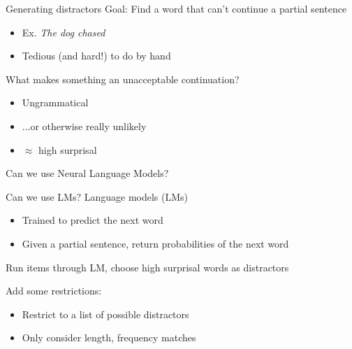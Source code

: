 \documentclass[12pt, xcolor=beamer,table,usenames,dvipsnames, ignorenonframetext, ngerman,t]{beamer}
\begin{document}
%
\begin{frame}{Generating distractors}
\pause
Goal: Find a word that can't continue a partial sentence
\begin{itemize}
	\item Ex.  \textit{The dog chased} \pause
	\item Tedious (and hard!) to do by hand
\end{itemize} \pause

What makes something an unacceptable continuation? \pause
\begin{itemize}
	\item Ungrammatical \pause
	\item ...or otherwise really unlikely \pause 
	\item $\approx$ high surprisal 
\end{itemize} \pause

Can we use Neural Language Models?
\end{frame}
%
\begin{frame}{Can we use LMs?}
	\pause
Language models (LMs)
\begin{itemize}
	\item Trained to predict the next word
	\item Given a partial sentence, return probabilities of the next word
\end{itemize}\pause

Run items through LM, choose high surprisal words as distractors
\pause

Add some restrictions:
\begin{itemize}
\item Restrict to a list of possible distractors
\item Only consider length, frequency matches
\end{itemize}
	
\end{frame}
%
\end{document}
